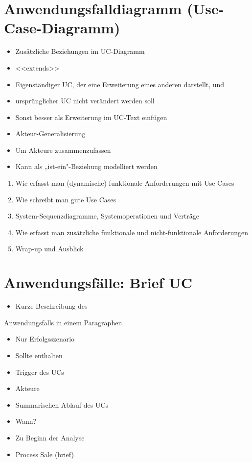 \documentclass[10pt]{article}
\begin{document}
\section*{Anwendungsfalldiagramm (Use-Case-Diagramm)}
\begin{itemize}
  \item Zusätzliche Beziehungen im UC-Diagramm
  \item <<extends>>
  \item Eigenständiger UC, der eine Erweiterung eines anderen darstellt, und
  \item ursprünglicher UC nicht verändert werden soll
  \item Sonst besser als Erweiterung im UC-Text einfügen
  \item Akteur-Generalisierung
  \item Um Akteure zusammenzufassen
  \item Kann als „ist-ein"-Beziehung modelliert werden
\end{itemize}

\begin{enumerate}
  \item Wie erfasst man (dynamische) funktionale Anforderungen mit Use Cases
  \item Wie schreibt man gute Use Cases
  \item System-Sequenzdiagramme, Systemoperationen und Verträge
  \item Wie erfasst man zusätzliche funktionale und nicht-funktionale Anforderungen
  \item Wrap-up und Ausblick
\end{enumerate}

\section*{Anwendungsfälle: Brief UC}
\begin{itemize}
  \item Kurze Beschreibung des
\end{itemize}

Anwendungsfalls in einem Paragraphen

\begin{itemize}
  \item Nur Erfolgsszenario
  \item Sollte enthalten
  \item Trigger des UCs
  \item Akteure
  \item Summarischen Ablauf des UCs
  \item Wann?
  \item Zu Beginn der Analyse
  \item Process Sale (brief)
\end{itemize}
\end{document}

